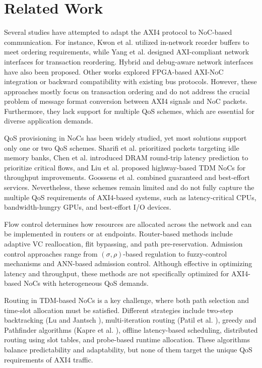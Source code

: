 \section{Related Work}

Several studies have attempted to adapt the AXI4 protocol to NoC-based communication. For instance, Kwon et al.\cite{yang_nisar_2007} utilized in-network reorder buffers to meet ordering requirements, while Yang et al.\cite{kwon_-network_2009} designed AXI-compliant network interfaces for transaction reordering. Hybrid and debug-aware network interfaces have also been proposed. 
Other works explored FPGA-based AXI-NoC integration or backward compatibility with existing bus protocols. However, these approaches mostly focus on transaction ordering and do not address the crucial problem of message format conversion between AXI4 signals and NoC packets. Furthermore, they lack support for multiple QoS schemes, which are essential for diverse application demands. 


QoS provisioning in NoCs has been widely studied, yet most solutions support only one or two QoS schemes. Sharifi et al.\cite{sharifi_addressing_2012} prioritized packets targeting idle memory banks, Chen et al.\cite{chen_round-trip_2017} introduced DRAM round-trip latency prediction to prioritize critical flows, and Liu et al.\cite{liu_highway_2015} proposed highway-based TDM NoCs for throughput improvements. Goossens et al.\cite{goossens_aethereal_2005} combined guaranteed and best-effort services. Nevertheless, these schemes remain limited and do not fully capture the multiple QoS requirements of AXI4-based systems, such as latency-critical CPUs, bandwidth-hungry GPUs, and best-effort I/O devices. 


Flow control determines how resources are allocated across the network and can be implemented in routers or at endpoints. Router-based methods include adaptive VC reallocation, flit bypassing, and path pre-reservation. Admission control approaches range from $(\sigma,\rho)$-based regulation to fuzzy-control mechanisms and ANN-based admission control. Although effective in optimizing latency and throughput, these methods are not specifically optimized for AXI4-based NoCs with heterogeneous QoS demands. 


Routing in TDM-based NoCs is a key challenge, where both path selection and time-slot allocation must be satisfied. Different strategies include two-step backtracking (Lu and Jantsch \cite{lu_tdm_2008}), multi-iteration routing (Patil et al. \cite{patil_bandwidth-optimized_2018}), greedy and Pathfinder algorithms (Kapre et al. \cite{kapre_packet_2006}), offline latency-based scheduling, distributed routing using slot tables, and probe-based runtime allocation. These algorithms balance predictability and adaptability, but none of them target the unique QoS requirements of AXI4 traffic. 



